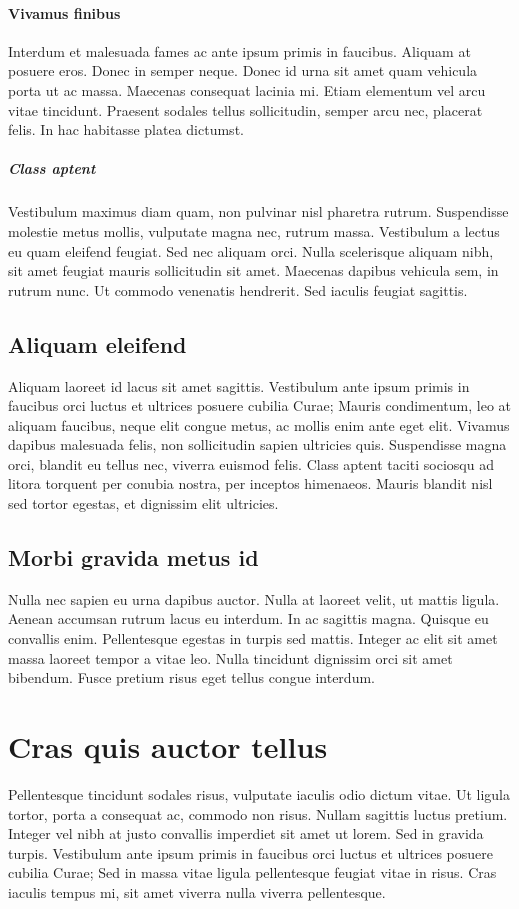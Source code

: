 \documentclass[11pt, a4paper]{article}
\begin{document}
\paragraph{Vivamus finibus}
Interdum et malesuada fames ac ante ipsum primis in faucibus. Aliquam at posuere eros. Donec in semper neque. Donec id urna sit amet quam vehicula porta ut ac massa. Maecenas consequat lacinia mi. Etiam elementum vel arcu vitae tincidunt. Praesent sodales tellus sollicitudin, semper arcu nec, placerat felis. In hac habitasse platea dictumst.

\subparagraph{Class aptent}
Vestibulum maximus diam quam, non pulvinar nisl pharetra rutrum. Suspendisse molestie metus mollis, vulputate magna nec, rutrum massa. Vestibulum a lectus eu quam eleifend feugiat. Sed nec aliquam orci. Nulla scelerisque aliquam nibh, sit amet feugiat mauris sollicitudin sit amet. Maecenas dapibus vehicula sem, in rutrum nunc. Ut commodo venenatis hendrerit. Sed iaculis feugiat sagittis.

\subsection{Aliquam eleifend}
Aliquam laoreet id lacus sit amet sagittis. Vestibulum ante ipsum primis in faucibus orci luctus et ultrices posuere cubilia Curae; Mauris condimentum, leo at aliquam faucibus, neque elit congue metus, ac mollis enim ante eget elit. Vivamus dapibus malesuada felis, non sollicitudin sapien ultricies quis. Suspendisse magna orci, blandit eu tellus nec, viverra euismod felis. Class aptent taciti sociosqu ad litora torquent per conubia nostra, per inceptos himenaeos. Mauris blandit nisl sed tortor egestas, et dignissim elit ultricies.

\subsection{Morbi gravida metus id}
Nulla nec sapien eu urna dapibus auctor. Nulla at laoreet velit, ut mattis ligula. Aenean accumsan rutrum lacus eu interdum. In ac sagittis magna. Quisque eu convallis enim. Pellentesque egestas in turpis sed mattis. Integer ac elit sit amet massa laoreet tempor a vitae leo. Nulla tincidunt dignissim orci sit amet bibendum. Fusce pretium risus eget tellus congue interdum.

\section{Cras quis auctor tellus}
Pellentesque tincidunt sodales risus, vulputate iaculis odio dictum vitae. Ut ligula tortor, porta a consequat ac, commodo non risus. Nullam sagittis luctus pretium. Integer vel nibh at justo convallis imperdiet sit amet ut lorem. Sed in gravida turpis. Vestibulum ante ipsum primis in faucibus orci luctus et ultrices posuere cubilia Curae; Sed in massa vitae ligula pellentesque feugiat vitae in risus. Cras iaculis tempus mi, sit amet viverra nulla viverra pellentesque.
\end{document}
